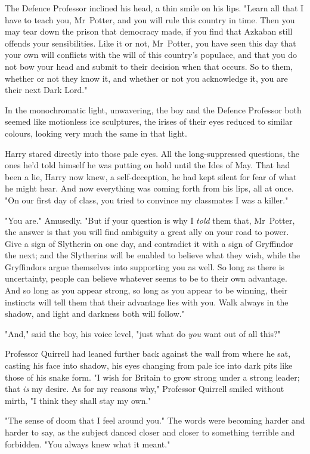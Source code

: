 The Defence Professor inclined his head, a thin smile on his lips. "Learn all
that I have to teach you, Mr~Potter, and you will rule this country in time.
Then you may tear down the prison that democracy made, if you find that Azkaban
still offends your sensibilities. Like it or not, Mr~Potter, you have seen
this day that your own will conflicts with the will of this country's populace,
and that you do not bow your head and submit to their decision when that
occurs. So to them, whether or not they know it, and whether or not you
acknowledge it, you are their next Dark Lord."

In the monochromatic light, unwavering, the boy and the Defence Professor both
seemed like motionless ice sculptures, the irises of their eyes reduced to
similar colours, looking very much the same in that light.

Harry stared directly into those pale eyes. All the long-suppressed questions,
the ones he'd told himself he was putting on hold until the Ides of May. That
had been a lie, Harry now knew, a self-deception, he had kept silent for fear
of what he might hear. And now everything was coming forth from his lips, all
at once. "On our first day of class, you tried to convince my classmates I was
a killer."

"You are." Amusedly. "But if your question is why I \emph{told} them that,
Mr~Potter, the answer is that you will find ambiguity a great ally on your
road to power. Give a sign of Slytherin on one day, and contradict it with a
sign of Gryffindor the next; and the Slytherins will be enabled to believe what
they wish, while the Gryffindors argue themselves into supporting you as well.
So long as there is uncertainty, people can believe whatever seems to be to
their own advantage. And so long as you appear strong, so long as you appear to
be winning, their instincts will tell them that their advantage lies with you.
Walk always in the shadow, and light and darkness both will follow."

"And," said the boy, his voice level, "just what do \emph{you} want out of all
this?"

Professor Quirrell had leaned further back against the wall from where he sat,
casting his face into shadow, his eyes changing from pale ice into dark pits
like those of his snake form. "I wish for Britain to grow strong under a strong
leader; that \emph{is} my desire. As for my reasons why," Professor Quirrell
smiled without mirth, "I think they shall stay my own."

"The sense of doom that I feel around you." The words were becoming harder and
harder to say, as the subject danced closer and closer to something terrible
and forbidden. "You always knew what it meant."


